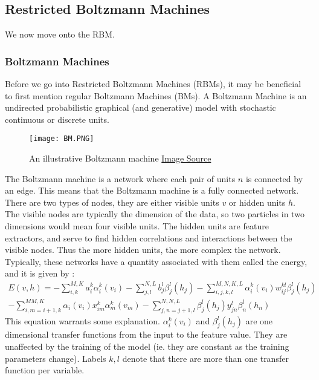 \documentclass[12pt]{article}
\begin{document}
{\subsection{Restricted Boltzmann Machines} \label{RBM}
We now move onto the RBM.
\subsubsection{Boltzmann Machines}
Before we go into Restricted Boltzmann Machines (RBMs), it may be beneficial to first mention regular Boltzmann Machines (BMs). A Boltzmann Machine is an undirected probabilistic graphical (and generative) model with stochastic continuous or discrete units. \newline
\begin{figure}[ht!]
    \centering
    \texttt{[image: BM.PNG]}
    \caption{An illustrative Boltzmann machine
    \newline
    \href{https://arxiv.org/pdf/1708.06008}{Image Source}
    }
    \label{fig:BM}
\end{figure} \newline
The Boltzmann machine is a network where each pair of units $n$ is connected by an edge. This means that the Boltzmann machine is a fully connected network. There are two types of nodes, they are either visible units $v$ or hidden units $h$. The visible nodes are typically the dimension of the data, so two particles in two dimensions would mean four visible units. The hidden units are feature extractors, and serve to find hidden correlations and interactions between the visible nodes. Thus the more hidden units, the more complex the network.
\newline
Typically, these networks have a quantity associated with them called the energy, and it is given by \cite{mhjorth-RBM}:
\begin{equation*}
\begin{split}
    E(v, h) = - \sum_{i,k}^{M,K} a_i^k \alpha_i^k (v_i) - \sum_{j, l}^{N, L} b_j^l \beta_j^l (h_j) - \sum_{i,j,k,l}^{M,N,K,L} \alpha_i^k (v_i) w_{ij}^{kl} \beta_j^l (h_j) \\
    - \sum_{i,m=i+1, k}^{MM, K} \alpha_i (v_i) x_{im}^k \alpha_m^k (v_m) - \sum_{j,n=j+1, l}^{N,N,L} \beta_j^l (h_j) y_{jn}^l \beta_{n}^l (h_n)
\end{split}
\end{equation*}
\newline
This equation warrants some explanation. $\alpha^k_i (v_i)$ and $\beta^l_j (h_j)$ are one dimensional transfer functions from the input to the feature value. They are unaffected by the training of the model (ie. they are constant as the training parameters change). Labels $k, l$ denote that there are more than one transfer function per variable.
}
\end{document}
